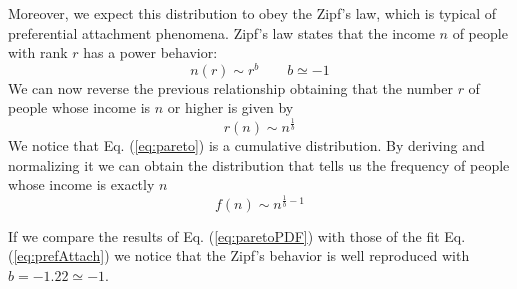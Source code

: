 Moreover, we expect this distribution to obey the Zipf's law, which is typical of preferential attachment phenomena.
Zipf's law states that the income $n$ of people with rank $r$ has a power behavior:
\begin{equation}
    n(r) \sim r^b \ \ \ \ \ \ \ \ \ b \simeq -1
    \label{eq:zipf}
\end{equation}
We can now reverse the previous relationship \cite{zipf} obtaining that the number $r$ of people whose income is $n$ or higher is given by
\begin{equation}
    r(n) \sim n^{\frac{1}{b}}
    \label{eq:pareto}
\end{equation}
We notice that Eq. (\ref{eq:pareto}) is a cumulative distribution.
By deriving and normalizing it we can obtain the distribution that tells us the frequency of people whose income is exactly $n$
\begin{equation}
    f(n) \sim n^{\frac{1}{b} - 1}
    \label{eq:paretoPDF}
\end{equation}

If we compare the results of Eq. (\ref{eq:paretoPDF}) with those of the fit Eq. (\ref{eq:prefAttach}) we notice that the Zipf's behavior is well reproduced with $b = -1.22 \simeq -1$.